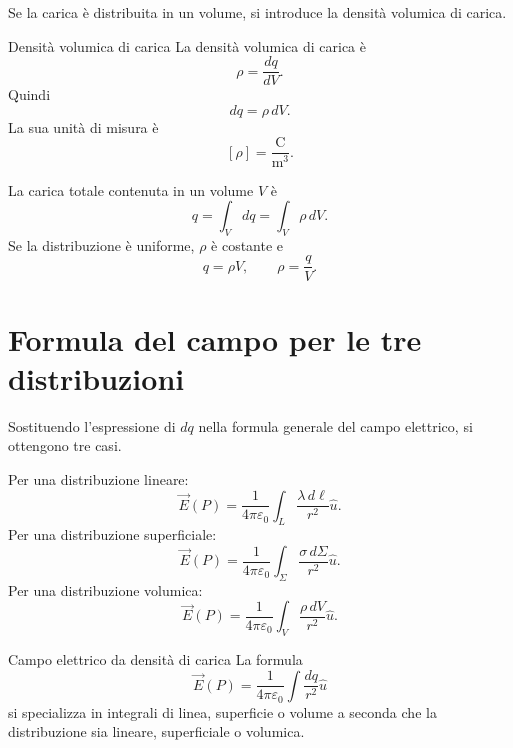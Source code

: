 \documentclass[a4paper]{article}
\begin{document}
Se la carica è distribuita in un volume, si introduce la densità volumica di carica.

\begin{snippetdefinition}{Densità volumica di carica}
    La densità volumica di carica è
    \[
        \rho=\frac{dq}{dV}.
    \]
    Quindi
    \[
        dq=\rho\,dV.
    \]
    La sua unità di misura è
    \[
        [\rho]=\frac{\mathrm{C}}{\mathrm{m}^3}.
    \]
\end{snippetdefinition}

La carica totale contenuta in un volume \(V\) è
\[
    q=\int_V dq=\int_V \rho\,dV.
\]
Se la distribuzione è uniforme, \(\rho\) è costante e
\[
    q=\rho V,
    \qquad
    \rho=\frac{q}{V}.
\]

\begin{center}
\end{center}

\section{Formula del campo per le tre distribuzioni}

Sostituendo l'espressione di \(dq\) nella formula generale del campo elettrico, si ottengono tre casi.

Per una distribuzione lineare:
\[
    \vec{E}(P)=\frac{1}{4\pi\varepsilon_0}\int_L\frac{\lambda\,d\ell}{r^2}\hat{u}.
\]
Per una distribuzione superficiale:
\[
    \vec{E}(P)=\frac{1}{4\pi\varepsilon_0}\int_\Sigma\frac{\sigma\,d\Sigma}{r^2}\hat{u}.
\]
Per una distribuzione volumica:
\[
    \vec{E}(P)=\frac{1}{4\pi\varepsilon_0}\int_V\frac{\rho\,dV}{r^2}\hat{u}.
\]

\begin{snippetproposition}{Campo elettrico da densità di carica}
    La formula
    \[
        \vec{E}(P)=\frac{1}{4\pi\varepsilon_0}\int\frac{dq}{r^2}\hat{u}
    \]
    si specializza in integrali di linea, superficie o volume a seconda che la distribuzione sia lineare, superficiale o volumica.
\end{snippetproposition}
\end{document}
